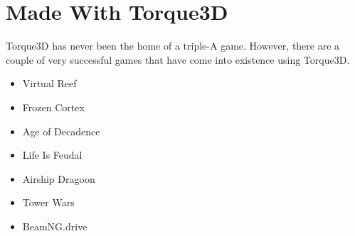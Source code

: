 

\chapter{Made With Torque3D}
\label{cha:made-with-t3d}

Torque3D has never been the home of a triple-A game. However, there are a couple of very successful games that have come into existence using Torque3D.

\begin{itemize}
	\item Virtual Reef
	\item Frozen Cortex
	\item Age of Decadence
	\item Life Is Feudal
	\item Airship Dragoon
	\item Tower Wars
	\item BeamNG.drive
\end{itemize}

\blindtext